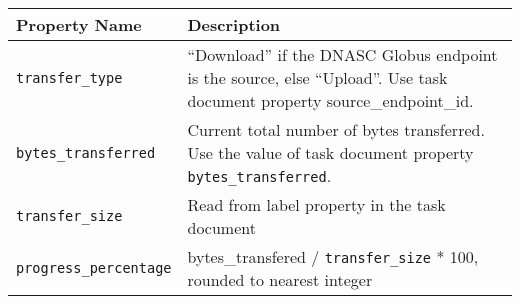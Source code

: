 \begin{tabularx}{\textwidth}{l|X}
\hline
 Property Name       & Description                                                                                                              \\
\hline
 \texttt{transfer\_type}       & ``Download'' if the DNASC Globus endpoint is the source, else ``Upload''. Use task document property source\_endpoint\_id. \\
 \texttt{bytes\_transferred}   & Current total number of bytes transferred. Use the value of task document property \texttt{bytes\_transferred}.                    \\
 \texttt{transfer\_size}       & Read from label property in the task document                                                                            \\
 \texttt{progress\_percentage} & bytes\_transfered / \texttt{transfer\_size} * 100, rounded to nearest integer                                                       \\
\hline
\end{tabularx}